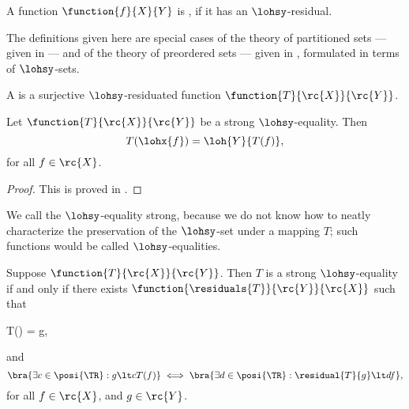 \documentclass[b5paper, english, oneside]{memoir}
\begin{document}
\begin{definition}
A function $\function{f}{X}{Y}$ is , if it has an $\lohsy$-residual.
\end{definition}

\begin{note}[]
The definitions given here are special cases of the theory of partitioned sets --- given in  --- and of the theory of preordered sets --- given in , formulated in terms of $\lohsy$-sets.
\end{note}

\begin{definition}
A  is a surjective $\lohsy$-residuated function $\function{T}{\rc{X}}{\rc{Y}}$. 
\end{definition}

\begin{theorem}
\label{StrongOEqualityRule}
Let $\function{T}{\rc{X}}{\rc{Y}}$ be a strong $\lohsy$-equality. Then
\begin{equation}
T(\lohx{f}) = \loh{Y}{T(f)},
\end{equation}
for all $f \in \rc{X}$.
\end{theorem}

\begin{proof}
This is proved in .
\end{proof}

\begin{note}
We call the $\lohsy$-equality strong, because we do not know how to neatly characterize the preservation of the $\lohsy$-set under a mapping $T$; such functions would be called $\lohsy$-equalities.
\end{note}

\begin{theorem}
\label{StrongOEqualityByLinearDominance}
Suppose $\function{T}{\rc{X}}{\rc{Y}}$. Then $T$ is a strong $\lohsy$-equality if and only if there exists $\function{\residuals{T}}{\rc{Y}}{\rc{X}}$ such that
\begin{eqs}
T() = g,
\end{eqs}
and
\begin{equation}
\bra{\exists c \in \posi{\TR} : g \lt c T(f)} \iff 
\bra{\exists d \in \posi{\TR} : \residual{T}{g} \lt d f},
\end{equation}
for all $f \in \rc{X}$, and $g \in \rc{Y}$.
\end{theorem}
\end{document}
